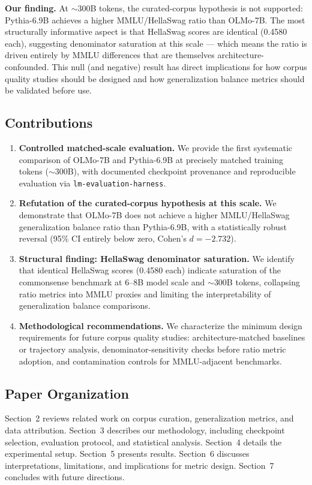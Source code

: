 \textbf{Our finding.} At $\sim$300B tokens, the curated-corpus hypothesis is not supported: Pythia-6.9B achieves a higher MMLU/HellaSwag ratio than OLMo-7B. The most structurally informative aspect is that HellaSwag scores are identical (0.4580 each), suggesting denominator saturation at this scale --- which means the ratio is driven entirely by MMLU differences that are themselves architecture-confounded. This null (and negative) result has direct implications for how corpus quality studies should be designed and how generalization balance metrics should be validated before use.

\subsection*{Contributions}

\begin{enumerate}
    \item \textbf{Controlled matched-scale evaluation.} We provide the first systematic comparison of OLMo-7B and Pythia-6.9B at precisely matched training tokens ($\sim$300B), with documented checkpoint provenance and reproducible evaluation via \texttt{lm-evaluation-harness}.
    \item \textbf{Refutation of the curated-corpus hypothesis at this scale.} We demonstrate that OLMo-7B does not achieve a higher MMLU/HellaSwag generalization balance ratio than Pythia-6.9B, with a statistically robust reversal (95\% CI entirely below zero, Cohen's $d = -2.732$).
    \item \textbf{Structural finding: HellaSwag denominator saturation.} We identify that identical HellaSwag scores (0.4580 each) indicate saturation of the commonsense benchmark at 6--8B model scale and $\sim$300B tokens, collapsing ratio metrics into MMLU proxies and limiting the interpretability of generalization balance comparisons.
    \item \textbf{Methodological recommendations.} We characterize the minimum design requirements for future corpus quality studies: architecture-matched baselines or trajectory analysis, denominator-sensitivity checks before ratio metric adoption, and contamination controls for MMLU-adjacent benchmarks.
\end{enumerate}

\subsection*{Paper Organization}

Section~2 reviews related work on corpus curation, generalization metrics, and data attribution. Section~3 describes our methodology, including checkpoint selection, evaluation protocol, and statistical analysis. Section~4 details the experimental setup. Section~5 presents results. Section~6 discusses interpretations, limitations, and implications for metric design. Section~7 concludes with future directions.
